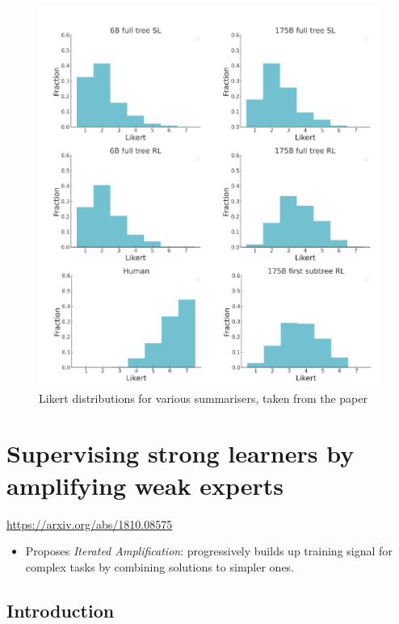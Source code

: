 \begin{figure}
    \centering
    \includegraphics[width=.95\linewidth]{images/likert-distros.png}
    \caption{Likert distributions for various summarisers, taken from the paper}
    \label{fig:likert}
\end{figure}


\section{Supervising strong learners by amplifying weak experts}

\url{https://arxiv.org/abs/1810.08575}

\begin{itemize}
    \item Proposes \emph{Iterated Amplification}: progressively builds up training signal for complex tasks by combining solutions to simpler ones.
\end{itemize}

\subsection{Introduction}

